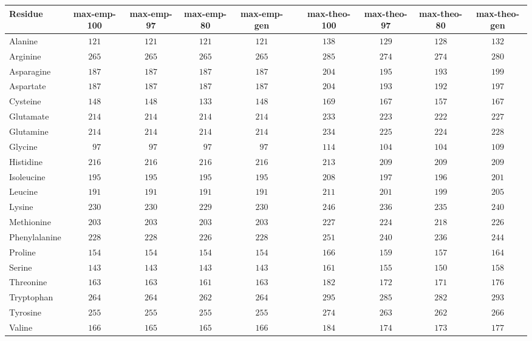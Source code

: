 \documentclass[12pt]{article}
\begin{document}
\begin{center}
\footnotesize
\begin{tabular}{lccccccccc}
Residue & max-emp-100 & max-emp-97 & max-emp-80 & max-emp-gen & & max-theo-100 & max-theo-97 & max-theo-80 & max-theo-gen\\
\hline Alanine   & $121$ & $121$ & $121$ & $121$ & & $138$ & $129$ & $128$ & $132$\\
Arginine         & $265$ & $265$ & $265$ & $265$ & & $285$ & $274$ & $274$ & $280$\\
Asparagine       & $187$ & $187$ & $187$ & $187$ & & $204$ & $195$ & $193$ & $199$\\
Aspartate        & $187$ & $187$ & $187$ & $187$ & & $204$ & $193$ & $192$ & $197$\\
Cysteine         & $148$ & $148$ & $133$ & $148$ & & $169$ & $167$ & $157$ & $167$\\
Glutamate        & $214$ & $214$ & $214$ & $214$ & & $233$ & $223$ & $222$ & $227$\\
Glutamine        & $214$ & $214$ & $214$ & $214$ & & $234$ & $225$ & $224$ & $228$\\
Glycine          & $\phantom{0}97$ & $\phantom{0}97$ & $\phantom{0}97$ & $\phantom{0}97$ & & $114$ & $104$ & $104$ & $109$\\
Histidine        & $216$ & $216$ & $216$ & $216$ & & $213$ & $209$ & $209$ & $209$\\
Isoleucine       & $195$ & $195$ & $195$ & $195$ & & $208$ & $197$ & $196$ & $201$\\
Leucine          & $191$ & $191$ & $191$ & $191$ & & $211$ & $201$ & $199$ & $205$\\
Lysine           & $230$ & $230$ & $229$ & $230$ & & $246$ & $236$ & $235$ & $240$\\
Methionine       & $203$ & $203$ & $203$ & $203$ & & $227$ & $224$ & $218$ & $226$\\
Phenylalanine    & $228$ & $228$ & $226$ & $228$ & & $251$ & $240$ & $236$ & $244$\\
Proline          & $154$ & $154$ & $154$ & $154$ & & $166$ & $159$ & $157$ & $164$\\
Serine           & $143$ & $143$ & $143$ & $143$ & & $161$ & $155$ & $150$ & $158$\\
Threonine        & $163$ & $163$ & $161$ & $163$ & & $182$ & $172$ & $171$ & $176$\\
Tryptophan       & $264$ & $264$ & $262$ & $264$ & & $295$ & $285$ & $282$ & $293$\\
Tyrosine         & $255$ & $255$ & $255$ & $255$ & & $274$ & $263$ & $262$ & $266$\\
Valine           & $166$ & $165$ & $165$ & $166$ & & $184$ & $174$ & $173$ & $177$\\
\hline
\end{tabular}
\end{center}
\end{document}
